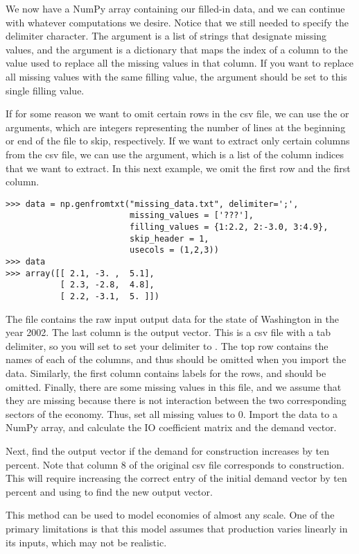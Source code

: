 We now have a NumPy array containing our filled-in data, and we can continue with whatever computations we desire. Notice
that we still needed to specify the delimiter character. The  argument is a list of strings that 
designate missing values, and the  argument is a dictionary that maps the index of a column to the 
value used to replace all the missing values in that column. If you want to replace all missing values with the same
filling value, the  argument should be set to this single filling value.

If for some reason we want to omit certain rows in the csv file, we can use the  or  
arguments, which are integers representing the number of lines at the beginning or end of the file to skip, respectively.
If we want to extract only certain columns from the csv file, we can use the  argument, which is a list of
the column indices that we want to extract. In this next example, we omit the first row and the first column.

\begin{lstlisting}
>>> data = np.genfromtxt("missing_data.txt", delimiter=';',
                         missing_values = ['???'],
                         filling_values = {1:2.2, 2:-3.0, 3:4.9},
                         skip_header = 1,
                         usecols = (1,2,3))
>>> data
>>> array([[ 2.1, -3. ,  5.1],
           [ 2.3, -2.8,  4.8],
           [ 2.2, -3.1,  5. ]])

\end{lstlisting}

\begin{problem}
The file  contains the raw input output data for the state of Washington in the year 2002.
The last column is the output vector. This is a csv file with a tab delimiter, so you will set to set your 
delimiter to . The top row contains the names of each of the columns, and thus should be omitted when
you import the data. Similarly, the first column contains labels for the rows, and should be omitted. Finally,
there are some missing values in this file, and we assume that they are missing because there is not interaction
between the two corresponding sectors of the economy. Thus, set all missing values to 0. Import the data
to a NumPy array, and calculate the IO coefficient matrix and the demand vector.

Next, find the output vector if the demand for construction increases by ten percent.
Note that column 8 of the original csv file corresponds to construction.
This will require increasing the correct entry of the initial 
demand vector by ten percent and using  to find the new output vector.
\end{problem}

This method can be used to model economies of almost any scale.
One of the primary limitations is that this model assumes that production varies linearly in its inputs, which may not be realistic.
